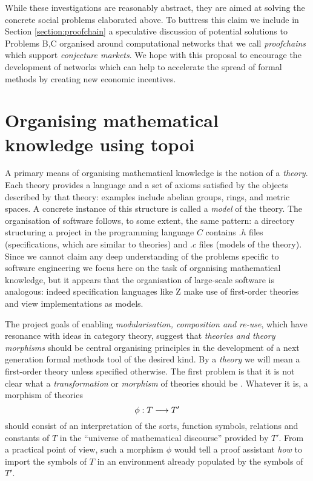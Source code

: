 \documentclass[english,letter paper,12pt,reqno]{article}
\theoremstyle{example}
\begin{document}
While these investigations are reasonably abstract, they are aimed at solving the concrete social problems elaborated above. To buttress this claim we include in Section \ref{section:proofchain} a speculative discussion of potential solutions to Problems B,C organised around computational networks that we call \emph{proofchains} which support \emph{conjecture markets}. We hope with this proposal to encourage the development of networks which can help to accelerate the spread of formal methods by creating new economic incentives.

\section{Organising mathematical knowledge using topoi}\label{section:section:organisation}

A primary means of organising mathematical knowledge is the notion of a \emph{theory}. Each theory provides a language and a set of axioms satisfied by the objects described by that theory: examples include abelian groups, rings, and metric spaces. A concrete instance of this structure is called a \emph{model} of the theory. The organisation of software follows, to some extent, the same pattern: a directory structuring a project in the programming language $C$ contains $.h$ files (specifications, which are similar to theories) and $.c$ files (models of the theory). Since we cannot claim any deep understanding of the problems specific to software engineering we focus here on the task of organising mathematical knowledge, but it appears that the organisation of large-scale software is analogous: indeed specification languages like Z \cite{potter} make use of first-order theories and view implementations as models. 

The project goals of enabling \emph{modularisation, composition and re-use}, which have resonance with ideas in category theory, suggest that \emph{theories and theory morphisms} should be central organising principles in the development of a next generation formal methods tool of the desired kind. By a \emph{theory} we will mean a first-order theory \cite[\S X.1]{topos} unless specified otherwise. The first problem is that it is not clear what a \emph{transformation} or \emph{morphism} of theories should be \cite[Lecture 1]{risingseminar}. Whatever it is, a morphism of theories
\[
\phi: T \longrightarrow T'
\]
should consist of an interpretation of the sorts, function symbols, relations and constants of $T$ in the ``universe of mathematical discourse'' provided by $T'$. From a practical point of view, such a morphism $\phi$ would tell a proof assistant \emph{how} to import the symbols of $T$ in an environment already populated by the symbols of $T'$. 
\end{document}
